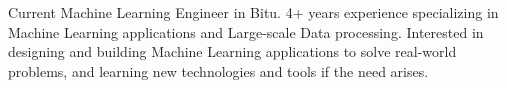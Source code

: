 

\begin{cvparagraph}

Current Machine Learning Engineer in Bitu. 4+ years experience specializing in Machine Learning applications and Large-scale Data processing. Interested in designing and building Machine Learning applications to solve real-world problems, and learning new technologies and
tools if the need arises.
\end{cvparagraph}

